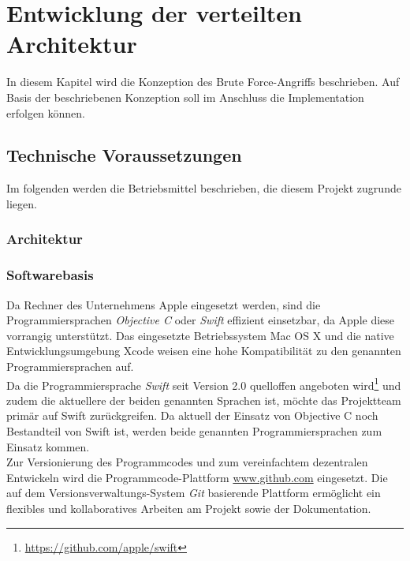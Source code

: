 \chapter{Entwicklung der verteilten Architektur}
\label{vorueberlegungen}
In diesem Kapitel wird die Konzeption des Brute Force-Angriffs beschrieben. Auf Basis der beschriebenen Konzeption soll im Anschluss die Implementation erfolgen können. 


\section{Technische Voraussetzungen}
\label{Voraussetzungen}
Im folgenden werden die Betriebsmittel beschrieben, die diesem Projekt zugrunde liegen.

\subsection{Architektur}

\subsection{Softwarebasis}
Da Rechner des Unternehmens Apple eingesetzt werden, sind die Programmiersprachen \emph{Objective C} oder \emph{Swift} effizient einsetzbar, da Apple diese vorrangig unterstützt. Das eingesetzte Betriebssystem Mac OS X %
und die native Entwicklungsumgebung Xcode%
weisen eine hohe Kompatibilität zu den genannten Programmiersprachen auf. \\
Da die Programmiersprache \emph{Swift} seit Version 2.0 quelloffen angeboten wird\footnote{\url{https://github.com/apple/swift}} und zudem die aktuellere der beiden genannten Sprachen ist, möchte das Projektteam primär auf Swift zurückgreifen. Da aktuell der Einsatz von Objective C noch Bestandteil von Swift ist, werden beide genannten Programmiersprachen zum Einsatz kommen. \\

Zur Versionierung des Programmcodes und zum vereinfachtem dezentralen Entwickeln wird die Programmcode-Plattform \url{www.github.com} eingesetzt. Die auf dem Versionsverwaltungs-System \emph{Git} basierende Plattform ermöglicht ein flexibles und kollaboratives Arbeiten am Projekt sowie der Dokumentation. \\

